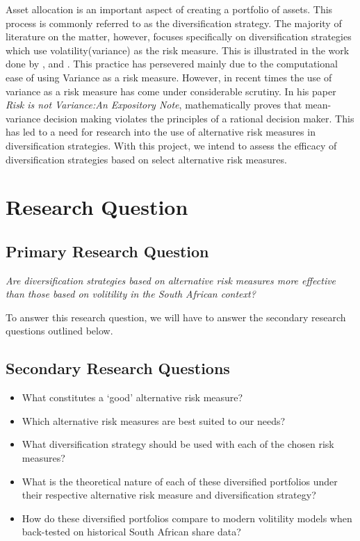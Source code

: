 \documentclass[12pt,a4paper]{article}
\newcommand{\bi}{\begin{itemize}}
\newcommand{\ei}{\end{itemize}}
\begin{document}
Asset allocation is an important aspect of creating a portfolio of assets. This process is commonly referred to as the diversification strategy. The majority of literature on the matter, however, focuses specifically on diversification strategies which use volatility(variance) as the risk measure. This is illustrated in the work done by \cite{chow2011survey}, and \cite{CHEN20111179}. This practice has persevered mainly due to the computational ease of using Variance as a risk measure. However, in recent times the use of variance as a risk measure has come under considerable scrutiny. In his paper \textit{Risk is not Variance:An Expository Note}, \cite{cox2008risk} mathematically proves that mean-variance decision making violates the principles of a rational decision maker. This has led to a need for research into the use of alternative risk measures in diversification strategies. With this project, we intend to assess the efficacy of diversification strategies based on select alternative risk measures.

\section{Research Question}
\label{sec:ResQues}

\subsection{Primary Research Question}
\label{subsec:PriRQ}

\textit{Are diversification strategies based on alternative risk measures more effective than those based on volitility in the South African context?}

To answer this research question, we will have to answer the secondary research questions outlined below.

\subsection{Secondary Research Questions}
\label{subsec:SecRQ}

\bi
\item What constitutes a ‘good’ alternative risk measure?
\item Which alternative risk measures are best suited to our needs?
\item What diversification strategy should be used with each of the chosen risk measures?
\item What is the theoretical nature of each of these diversified portfolios under their respective alternative risk measure and diversification strategy?
\item How do these diversified portfolios compare to modern volitility models when back-tested on historical South African share data?
\ei
 
\end{document}
